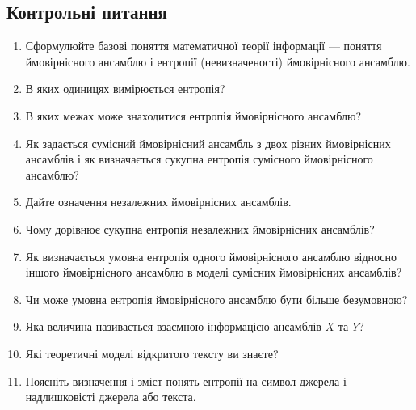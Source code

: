

\subsection{Контрольні питання}
\begin{enumerate}
    \item Сформулюйте базові поняття математичної теорії інформації --- поняття
    ймовірнісного ансамблю і ентропії (невизначеності) ймовірнісного ансамблю.
    \item В яких одиницях вимірюється ентропія?
    \item В яких межах може знаходитися ентропія ймовірнісного ансамблю?
    \item Як задається сумісний ймовірнісний ансамбль з двох різних
    ймовірнісних ансамблів і як визначається сукупна ентропія сумісного
    ймовірнісного ансамблю?
    \item Дайте означення незалежних ймовірнісних ансамблів.
    \item Чому дорівнює сукупна ентропія незалежних ймовірнісних ансамблів?
    \item Як визначається умовна ентропія одного ймовірнісного ансамблю
    відносно іншого ймовірнісного ансамблю в моделі сумісних
    ймовірнісних ансамблів?
    \item Чи може умовна ентропія ймовірнісного ансамблю бути більше
    безумовною?
    \item Яка величина називається взаємною інформацією ансамблів $X$ та $Y$?
    \item Які теоретичні моделі відкритого тексту ви знаєте?
    \item Поясніть визначення і зміст понять ентропії на символ джерела і
    надлишковісті джерела або текста.
\end{enumerate}


